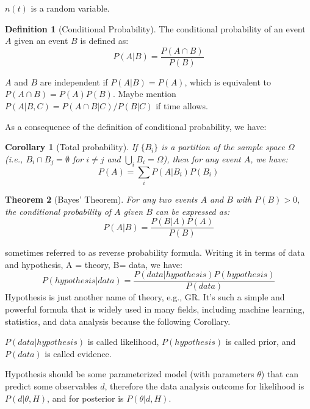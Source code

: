 \documentclass[12pt, a4paper]{article}
\newcounter{lecture}              %
\theoremstyle{plain} %
\newtheorem{theorem}{Theorem}[lecture]      %
\newtheorem{corollary}[theorem]{Corollary}
\theoremstyle{definition} %
\newtheorem{definition}{Definition}[lecture]
\begin{document}
$n(t)$ is a random variable.

\begin{definition}[Conditional Probability]
    The conditional probability of an event $A$ given an event $B$ is defined as:
    \begin{equation}
        P(A|B) = \frac{P(A \cap B)}{P(B)}
    \end{equation}
\end{definition}

$A$ and $B$ are independent if $P(A|B) = P(A)$, which is equivalent to $P(A \cap B) = P(A)P(B)$. Maybe mention $P(A|B,C) = P(A\cap B|C) / P(B|C)$ if time allows.

As a consequence of the definition of conditional probability, we have:
\begin{corollary}[Total probability]
    If $\{B_i\}$ is a partition of the sample space $\Omega$ (i.e., $B_i \cap B_j = \emptyset$ for $i \neq j$ and $\bigcup_i B_i = \Omega$), then for any event $A$, we have:
    \begin{equation}
        P(A) = \sum_i P(A|B_i) P(B_i)
    \end{equation}
\end{corollary}

\begin{theorem}[Bayes' Theorem]
    For any two events $A$ and $B$ with $P(B) > 0$, the conditional probability of $A$ given $B$ can be expressed as:
    \begin{equation}
        P(A|B) = \frac{P(B|A) P(A)}{P(B)}
    \end{equation}
\end{theorem}
sometimes referred to as reverse probability formula. Writing it in terms of data and hypothesis, A = theory, B= data, we have:
\begin{equation}
    P(hypothesis|data) = \frac{P(data|hypothesis) P(hypothesis)}{P(data)}
\end{equation}
Hypothesis is just another name of theory, e.g., GR. It's such a simple and powerful formula that is widely used in many fields, including machine learning, statistics, and data analysis because the following Corollary.

$P(data|hypothesis)$ is called likelihood, $P(hypothesis)$ is called prior, and $P(data)$ is called evidence.

Hypothesis should be some parameterized model (with parameters $\theta$) that can predict some observables $d$, therefore the data analysis outcome for likelihood is $P(d|\theta, H)$, and for posterior is $P(\theta|d, H)$.
\end{document}
